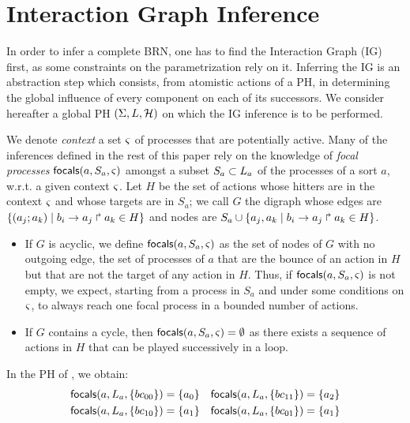 \section{Interaction Graph Inference}\label{sec:infer-IG}

In order to infer a complete BRN, one has to find the Interaction Graph (IG) first, as some constraints on the parametrization rely on it.
Inferring the IG is an abstraction step which consists, from atomistic actions of a PH, in determining the global influence of every component on each of its successors.
We consider hereafter a global PH $(\Sigma,L,\mathcal{H})$ on which the IG inference is to be performed.

We denote \emph{context} a set $\varsigma$ of processes that are potentially active.
Many of the inferences defined in the rest of this paper rely on the knowledge of \emph{focal processes} $\mathsf{focals}(a,S_a,\varsigma)$
amongst a subset $S_a \subset L_a$ of the processes of a sort $a$, w.r.t. a given context $\varsigma$.
Let $H$ be the set of actions whose hitters are in the context $\varsigma$ and whose targets are in $S_a$;
we call $G$ the digraph whose edges are $\{(a_j; a_k) \mid b_i\rightarrow a_j\Rsh a_k \in H\}$
and nodes are $S_a \cup \{a_j, a_k \mid b_i\rightarrow a_j\Rsh a_k \in H\}$.
\begin{itemize}
  \item If $G$ is acyclic, we define $\mathsf{focals}(a,S_a,\varsigma)$ as the set of nodes of $G$ with no outgoing edge, \ie the set of processes of $a$ that are the bounce of an action in $H$ but that are not the target of any action in $H$.
Thus, if $\mathsf{focals}(a,S_a,\varsigma)$ is not empty, we expect, starting from a process in $S_a$ and under some conditions on $\varsigma$, to always reach one focal process in a bounded number of actions.
  \item If $G$ contains a cycle, then $\mathsf{focals}(a,S_a,\varsigma) = \emptyset$ as there exists a sequence of actions in $H$ that can be played successively in a loop.
\end{itemize}

\begin{example*}
In the PH of , we obtain:
\begin{align*}
\mathsf{focals}(a,L_a,\{bc_{00}\}) &= \{ a_0 \} & \mathsf{focals}(a,L_a,\{bc_{11}\}) &= \{ a_2 \} \\
\mathsf{focals}(a,L_a,\{bc_{10}\}) &= \{ a_1 \} & \mathsf{focals}(a,L_a,\{bc_{01}\}) &= \{ a_1 \}
\end{align*}
\end{example*}



